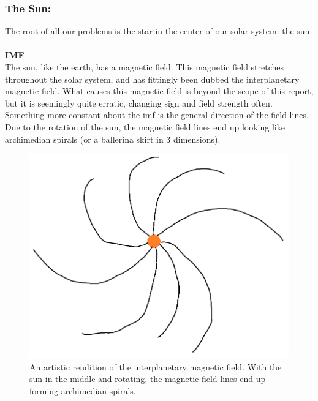 \documentclass[norsk,a4paper,12pt]{article}
\begin{document}
\begin{multicols}{2}
	\subsubsection{The Sun:} 
		The root of all our problems is the star in the center of our solar system: the sun.\\
		\\
		\textbf{IMF}\\
		The sun, like the earth, has a magnetic field. This magnetic field stretches throughout the solar system, and has fittingly been dubbed the 						interplanetary magnetic field. What causes this magnetic field is beyond the scope of this report, but it is seemingly quite erratic, changing 				sign and field strength often.\\
		Something more constant about the imf is the general direction of the field lines. Due to the rotation of the sun, the magnetic field lines end up looking 			like archimedian spirals (or a ballerina skirt in 3 dimensions).
		\begin{figure}[H]
			\includegraphics[scale = 0.3]{Figures/artistic_imf.png}
			\centering
			\caption{An artistic rendition of the interplanetary magnetic field. With the sun in the middle and rotating, the magnetic field lines end up forming 					     archimedian spirals.}
			\label{fig::spirals}
		\end{figure}


\end{multicols}
\end{document}
